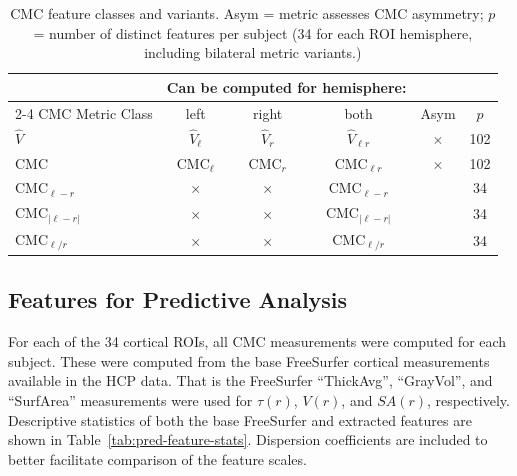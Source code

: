 \documentclass{article}
\begin{document}
\begin{table}[H]
\centering
\caption{CMC feature classes and variants. Asym = metric assesses CMC asymmetry; \(p\) = number of distinct features per subject (34 for each ROI hemisphere, including bilateral metric variants.)} \label{tab:cmc-variants}
\begin{tabular}{lccccc}
	\toprule

	                          &    \multicolumn{3}{c}{Can be computed for hemisphere:}         &      \\
  \cline{2-4}
	CMC Metric Class          &    left             &    right       & both             & Asym & $p$   \\
	\midrule
	$\hat{V}$                 & $\hat{V}_{\ell}$    & $\hat{V}_r$    & $\hat{V}_{\ell r}$        & $\times$   & 102 \\
	$\text{CMC}$              & $\text{CMC}_{\ell}$ & $\text{CMC}_r$ & $\text{CMC}_{\ell r}$     & $\times$   & 102 \\
	$\text{CMC}_{\ell - r}$   & $\times$            & $\times$       & $\text{CMC}_{\ell - r}$   & \checkmark &  34 \\
	$\text{CMC}_{|\ell - r|}$ & $\times$            & $\times$       & $\text{CMC}_{|\ell - r|}$ & \checkmark &  34 \\
	$\text{CMC}_{\ell / r}$   & $\times$            & $\times$       & $\text{CMC}_{\ell / r}$   & \checkmark &  34 \\
	\bottomrule
\end{tabular}
\end{table}


\subsection{Features for Predictive Analysis}




For each of the 34 cortical ROIs, all CMC measurements were computed for
each subject. These were computed from the base FreeSurfer cortical measurements
available in the HCP data. That is the FreeSurfer ``ThickAvg'', ``GrayVol'', and
``SurfArea'' measurements were used for \(\tau(r)\),  \(V(r)\), and \(SA(r)\),
respectively. Descriptive statistics of both the base FreeSurfer and extracted features
are shown in Table~\ref{tab:pred-feature-stats}. Dispersion coefficients are included to
better facilitate comparison of the feature scales.
\end{document}
